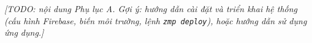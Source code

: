\documentclass[../main.tex]{subfiles}
\begin{document}

\textit{[TODO: nội dung Phụ lục A. Gợi ý: hướng dẫn cài đặt và triển khai hệ thống (cấu hình Firebase, biến môi trường, lệnh \texttt{zmp deploy}), hoặc hướng dẫn sử dụng ứng dụng.]}
\end{document}
